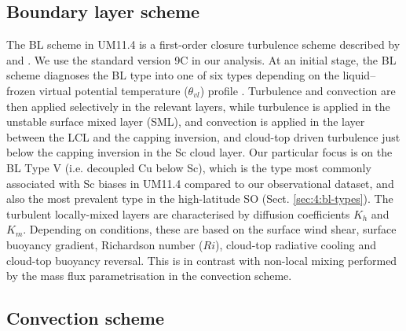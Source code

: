 \subsection{Boundary layer scheme}
\label{sec:4:bl-scheme}

The BL scheme in UM11.4 is a first-order closure turbulence
scheme described by \cite{lock2000} and \cite{martin2000}. We use the standard
version 9C in our analysis.
At an initial stage, the BL scheme diagnoses the BL type
into one of six types depending on the liquid--frozen virtual potential
temperature ($\theta_{vl}$) profile \cite[Fig. 1]{lock2000}. Turbulence and convection
are then applied selectively in the relevant layers, while turbulence is applied in the unstable surface mixed layer (SML), and convection is applied in the layer between
the LCL and the capping inversion, and cloud-top driven turbulence just below
the capping inversion in the Sc cloud layer. Our particular focus is on
the BL Type V (i.e. decoupled Cu below Sc), which is the type most commonly
associated with Sc biases in UM11.4 compared to our observational dataset,
and also the most prevalent type in the high-latitude SO (Sect. \ref{sec:4:bl-types}).
The turbulent locally-mixed layers are characterised by diffusion coefficients
$K_h$ and $K_m$. Depending on conditions, these are based on the surface wind
shear, surface buoyancy gradient, Richardson number ($Ri$),
cloud-top radiative cooling and cloud-top buoyancy reversal. This is in contrast
with non-local mixing performed by the mass flux parametrisation in the
convection scheme.

\subsection{Convection scheme}
\label{sec:4:convection-scheme}

